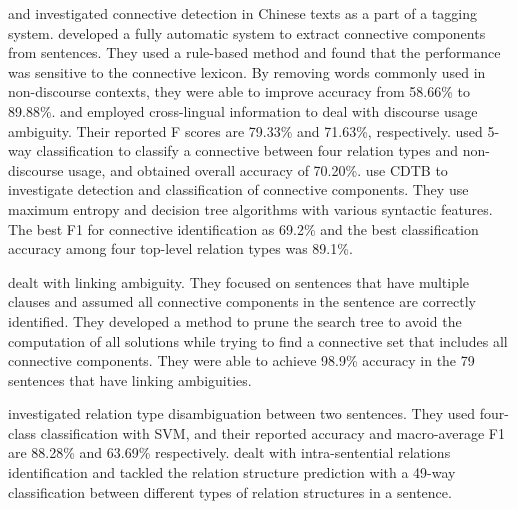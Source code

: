 \cite{t1999applying,t2000enhancement} and \cite{chan2000mining} investigated
connective detection in Chinese texts as a part of a tagging system. \cite{hu2009research}
developed a fully automatic system to extract connective components from sentences.
They used a rule-based method and found that the performance was sensitive to
the connective lexicon. By removing words commonly used in non-discourse contexts,
they were able to improve accuracy from 58.66\% to 89.88\%.
\cite{zhou2012cross} and \cite{li2014cross} employed
cross-lingual information to deal with discourse usage ambiguity.
Their reported F scores are 79.33\% and 71.63\%, respectively.
\cite{li2014cross} used 5-way classification to classify a connective
between four relation types and non-discourse usage,
and obtained overall accuracy of 70.20\%. \cite{li2015automatic} use CDTB to
investigate detection and classification of connective components. They use
maximum entropy and decision tree algorithms with various syntactic features.
The best F1 for connective identification as 69.2\% and the best classification
accuracy among four top-level relation types was 89.1\%.

\cite{hu2011research} dealt with linking ambiguity. They focused on sentences
that have multiple clauses and assumed all connective components in the sentence
are correctly identified. They developed a method to prune the search tree
to avoid the computation of all solutions while trying to find a connective
set that includes all connective components. They were able to achieve 98.9\%
accuracy in the 79 sentences that have linking ambiguities.

\cite{huang2011chinese} investigated relation type disambiguation between
two sentences. They used four-class classification with SVM, and their reported
accuracy and macro-average F1 are 88.28\% and 63.69\% respectively.
\cite{huang2012contingency} dealt with intra-sentential relations identification
and tackled the relation structure prediction with a 49-way classification
between different types of relation structures in a sentence.
